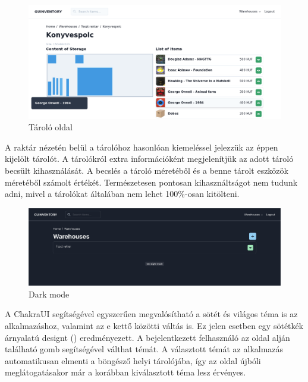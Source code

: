 \begin{figure}[!ht]
  \centering
  \includegraphics[width=150mm, keepaspectratio]{figures/storage.png}
  \caption{Tároló oldal}
  \label{fig:storage}
\end{figure}

A raktár nézetén belül a tárolóhoz hasonlóan kiemeléssel jelezzük az éppen kijelölt tárolót.
A tárolókról extra információként megjelenítjük az adott tároló becsült kihasználását.
A becslés a tároló méretéből és a benne tárolt eszközök méretéből számolt értékét.
Természetesen pontosan kihasználtságot nem tudunk adni, mivel a tárolókat általában nem lehet 100\%-osan kitölteni.

\begin{figure}[!ht]
  \centering
  \includegraphics[width=150mm, keepaspectratio]{figures/dark_mode.png}
  \caption{Dark mode}
  \label{fig:darkMode}
\end{figure}
A ChakraUI segítségével egyszerűen megvalósítható a sötét és világos téma is az alkalmazáshoz, valamint az e kettő közötti váltás is.
Ez jelen esetben egy sötétkék árnyalatú designt () eredményezett. 
A bejelentkezett felhasználó az oldal alján található gomb segítségével válthat témát.
A választott témát az alkalmazás automatikusan elmenti a böngésző helyi tárolójába, így az oldal újbóli meglátogatásakor már a korábban kiválasztott téma lesz érvényes.


